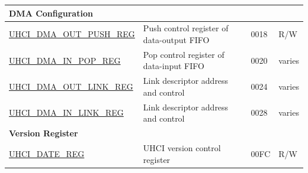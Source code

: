 \begin{longtable}{ | p{6cm} | p{7.2cm} | p{1.3cm} | p{1cm} | }
\multicolumn{4}{|l|}{\textbf{DMA Configuration}} \\ \hline
\hyperref[regdesc:UHCIDMAOUTPUSHREG]{UHCI\_DMA\_OUT\_PUSH\_REG} & Push control register of data-output FIFO & \hexprefix{}0018 & R/W \\ \hline
\hyperref[regdesc:UHCIDMAINPOPREG]{UHCI\_DMA\_IN\_POP\_REG} & Pop control register of data-input FIFO & \hexprefix{}0020 & varies \\ \hline
\hyperref[regdesc:UHCIDMAOUTLINKREG]{UHCI\_DMA\_OUT\_LINK\_REG} & Link descriptor address and control & \hexprefix{}0024 & varies \\ \hline
\hyperref[regdesc:UHCIDMAINLINKREG]{UHCI\_DMA\_IN\_LINK\_REG} & Link descriptor address and control & \hexprefix{}0028 & varies \\ \hline
\multicolumn{4}{|l|}{\textbf{Version Register}} \\ \hline
\hyperref[regdesc:UHCIDATEREG]{UHCI\_DATE\_REG} & UHCI version  control register & \hexprefix{}00FC & R/W \\ \hline
\end{longtable}
